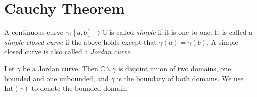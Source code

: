 \section{Cauchy Theorem}

\begin{defn}
A continuous curve $\gamma: [a, b] \to \mathbb{C}$ is called
\emph{simple} if it is one-to-one. It is called a
\emph{simple closed curve} if the above holds except that
$\gamma(a) = \gamma(b)$. A simple closed curve is also called
a \emph{Jordan curve}.
\end{defn}

\begin{theorem}
Let $\gamma$ be a Jordan curve. Then $\mathbb{C} \backslash \gamma$
is disjoint union of two domains, one bounded and one unbounded,
and $\gamma$ is the boundary of both domains. We use
$\mathrm{Int}(\gamma)$ to denote the bounded domain.
\end{theorem}

\begin{theorem}

\end{theorem}
